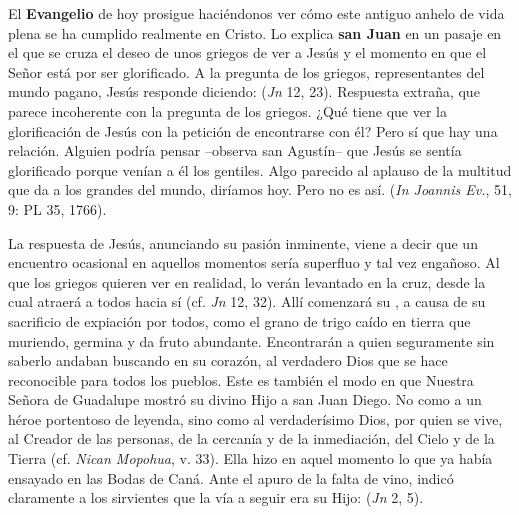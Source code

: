 \begin{body}
El \textbf{Evangelio} de hoy prosigue haciéndonos ver cómo este antiguo anhelo de vida plena se ha cumplido realmente en Cristo. Lo explica \textbf{san Juan} en un pasaje en el que se cruza el deseo de unos griegos de ver a Jesús y el momento en que el Señor está por ser glorificado. A la pregunta de los griegos, representantes del mundo pagano, Jesús responde diciendo:  (\textit{Jn} 12, 23). Respuesta extraña, que parece incoherente con la pregunta de los griegos. ¿Qué tiene que ver la glorificación de Jesús con la petición de encontrarse con él? Pero sí que hay una relación. Alguien podría pensar –observa san Agustín– que Jesús se sentía glorificado porque venían a él los gentiles. Algo parecido al aplauso de la multitud que da  a los grandes del mundo, diríamos hoy. Pero no es así.  (\textit{In Joannis Ev.}, 51, 9: PL 35, 1766).

La respuesta de Jesús, anunciando su pasión inminente, viene a decir que un encuentro ocasional en aquellos momentos sería superfluo y tal vez engañoso. Al que los griegos quieren ver en realidad, lo verán levantado en la cruz, desde la cual atraerá a todos hacia sí (cf. \textit{Jn} 12, 32). Allí comenzará su , a causa de su sacrificio de expiación por todos, como el grano de trigo caído en tierra que muriendo, germina y da fruto abundante. Encontrarán a quien seguramente sin saberlo andaban buscando en su corazón, al verdadero Dios que se hace reconocible para todos los pueblos. Este es también el modo en que Nuestra Señora de Guadalupe mostró su divino Hijo a san Juan Diego. No como a un héroe portentoso de leyenda, sino como al verdaderísimo Dios, por quien se vive, al Creador de las personas, de la cercanía y de la inmediación, del Cielo y de la Tierra (cf. \textit{Nican Mopohua}, v. 33). Ella hizo en aquel momento lo que ya había ensayado en las Bodas de Caná. Ante el apuro de la falta de vino, indicó claramente a los sirvientes que la vía a seguir era su Hijo:  (\textit{Jn} 2, 5).


\end{body}
